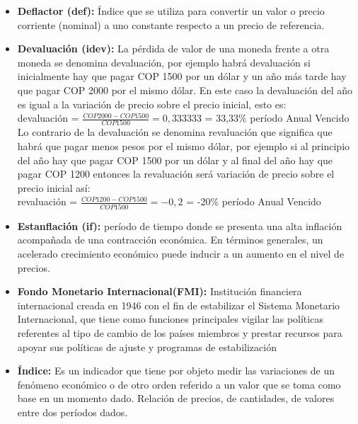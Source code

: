 \begin{itemize}
	\item {\textbf{Deflactor (def): }}
	      Índice que se utiliza para convertir un valor o precio corriente (nominal) a uno constante respecto a un precio de referencia.\\
	      
	\item {\textbf{Devaluación (idev): }}
	      La pérdida de valor de una moneda frente a otra moneda se denomina devaluación, por ejemplo habrá devaluación si inicialmente hay que pagar  COP 1500 por un dólar y un año más tarde hay que pagar  COP 2000 por el mismo dólar. En este caso la devaluación del año es igual a la variación de precio sobre el precio inicial, esto es:\\
	      
	      devaluación = $\frac{ COP 2000- COP 1500}{ COP 1500} = 0,333333 $ = 33,33\% período Anual Vencido \\
	      
	      Lo contrario de la devaluación se denomina revaluación que significa que habrá que pagar menos pesos por el mismo dólar, por ejemplo si al principio del año hay que pagar  COP 1500 por un dólar y al final del año hay que pagar  COP 1200 entonces la revaluación será variación de precio sobre el precio inicial así: \\
	      
	      revaluación = $\frac{ COP 1200- COP 1500}{ COP 1500} = -0,2$ = -20\% período Anual Vencido \\
	      
	      
	\item {\textbf{Estanflación (if): }}
	      período de tiempo donde se presenta una alta inflación acompañada de una contracción económica. En términos generales, un acelerado crecimiento económico puede inducir a un aumento en el nivel de precios.\\
	      
	\item \textbf{Fondo Monetario Internacional(FMI): }
	      Institución financiera internacional creada en 1946 con el fin de estabilizar el Sistema Monetario Internacional, que tiene como funciones principales vigilar las políticas referentes al tipo de cambio de los países miembros y prestar recursos para apoyar sus políticas de ajuste y programas de estabilización\\
	      
	\item {\textbf{Índice: }}
	      Es un indicador que tiene por objeto medir las variaciones de un fenómeno económico o de otro orden referido a un valor que se toma como base en un momento dado. Relación de precios, de cantidades, de valores entre dos períodos dados.\\
	      

\end{itemize}
